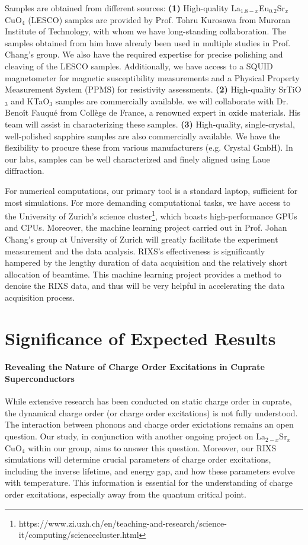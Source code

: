 \documentclass[11pt]{article}
\begin{document}
Samples are obtained from different sources: \textbf{(1)} High-quality {La$_{1.8-x}$Eu$_{0.2}$Sr$_x$CuO$_{4}$} (LESCO) samples are provided by Prof. Tohru Kurosawa from Muroran Institute of Technology, with whom we have long-standing collaboration. The samples obtained from him have already been used in multiple studies\cite{choi2022unveiling,wang_charge_2021} in Prof. Chang's group.
We also have the required expertise for precise polishing and cleaving of the LESCO samples. Additionally, we have access to a SQUID magnetometer for magnetic susceptibility measurements and a Physical Property Measurement System (PPMS) for resistivity assessments.
\textbf{(2)} High-quality SrTiO$_{3}$ and KTaO$_{3}$ samples are commercially available. we will collaborate with Dr. Benoît Fauqué from Collège de France, a renowned expert in oxide materials. His team will assist in characterizing these samples.
\textbf{(3)} High-quality, single-crystal, well-polished sapphire samples are also commercially available. We have the flexibility to procure these from various manufacturers (e.g. Crystal GmbH).
In our labs, samples can be well characterized and finely aligned using Laue diffraction.

For numerical computations, our primary tool is a standard laptop, sufficient for most simulations. For more demanding computational tasks, we have access to the University of Zurich's science cluster\footnote{https://www.zi.uzh.ch/en/teaching-and-research/science-it/computing/sciencecluster.html}, which boasts high-performance GPUs and CPUs. Moreover, the machine learning project carried out in Prof. Johan Chang's group at University of Zurich will greatly facilitate the experiment measurement and the data analysis. RIXS's  effectiveness is significantly hampered by the lengthy duration of data acquisition and the relatively short allocation of beamtime. This machine learning project provides a method to denoise the RIXS data, and thus will be very helpful in accelerating the data acquisition process.  


\section{Significance of Expected Results}
\paragraph{Revealing the Nature of Charge Order Excitations in Cuprate Superconductors} While extensive research has been conducted on static charge order in cuprate, the dynamical charge order (or charge order excitations) is not fully understood. The interaction between phonons and charge order exictations remains an open question. Our study, in conjunction with another ongoing project on La$_{2-x}$Sr$_x$CuO$_4$ within our group, aims to answer this question. Moreover, our RIXS simulations will determine crucial parameters of charge order excitations, including the inverse lifetime, and energy gap, and how these parameters evolve with temperature. This information is essential for the understanding of charge order excitations, especially away from the quantum critical point. 
\end{document}
